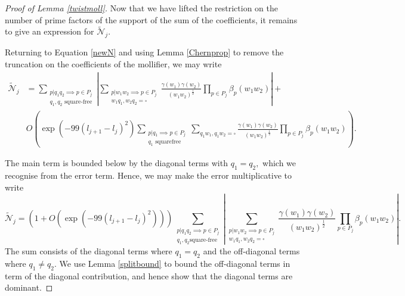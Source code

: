 \documentclass[12pt]{amsart}
\numberwithin{equation}{section}
\numberwithin{thm}{section}
\newcommand{\1}{\mathbf 1}
\begin{document}
\begin{proof}[Proof of Lemma \ref{twistmoll}] Now that we have lifted the restriction on the number of prime factors of the support of the sum of the coefficients, it remains to give an expression for $\tilde{\mathscr{N}}_{j}$.
	
	
	Returning to Equation \eqref{newN} and using Lemma \ref{Chernprop} to remove the truncation on the coefficients of the mollifier, we may write \begin{align}
			\tilde{\mathscr{N}}_j&=\sum_{\substack{p|q_1q_2\implies p\in P_{j}\\ q_1,q_2\text{ square-free}}}\left|\sum_{\substack{p|w_1w_2\implies p\in P_{j}\\ w_1q_1,w_2q_2=\square}}
			\frac{\gamma(w_1)\gamma(w_2)}{(w_1w_2)^{\frac{1}{2}}} \prod_{p\in P_{j}} 	\beta_p(w_1w_2)\right|+\\&\nonumber O\left(\exp(-99(l_{j+1}-l_{j})^2)\sum_{\substack{p|q_1\implies p\in P_{j}\\ q_1\text{  squarefree}}}\sum_{q_1w_1,q_1w_2=\square} \frac{\gamma(w_1)\gamma(w_2)}{(w_1w_2)^{\frac{1}{2}}} \prod_{p\in P_{j}} 	\beta_p(w_1w_2)\right).		\end{align}		

	The main term is bounded below by the diagonal terms with $q_1=q_2,$ which we recognise from the error term. Hence, we may make the error multiplicative to write 
	\begin{equation}\label{Multerrorn}	\tilde{\mathscr{N}}_j=\left(1+O\left(\exp(-99(l_{j+1}-l_{j})^2)\right)\right)\sum_{\substack{p|q_1q_2\implies p\in P_{j}\\ q_1,q_2\text{square-free}}}\left|\sum_{\substack{p|w_1w_2\implies p\in P_{j}\\ w_1q_1,w_2q_2=\square}}
			\frac{\gamma(w_1)\gamma(w_2)}{(w_1w_2)^{\frac{1}{2}}} \prod_{p\in P_{j}} 	\beta_p(w_1w_2)\right|. 			\end{equation}
		The sum consists of the diagonal terms where $q_1=q_2$ and the off-diagonal terms  where  $q_1\ne q_2$.
		We use Lemma \ref{splitbound} to bound the off-diagonal terms in term of the diagonal contribution, and hence show that the diagonal terms are dominant.
		

\end{proof}
\end{document}
